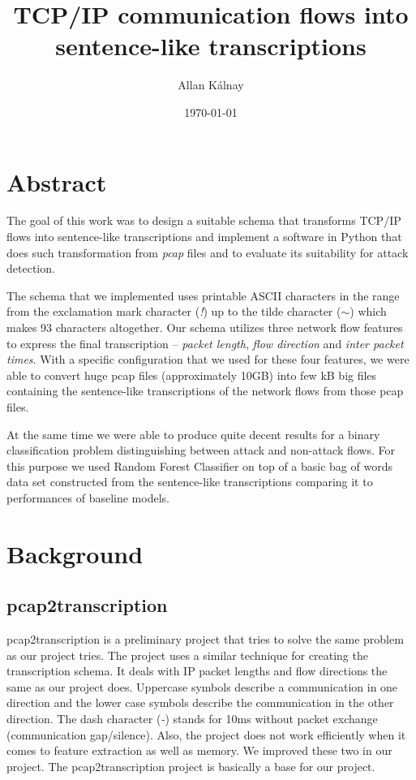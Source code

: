 \documentclass{article}
\title{TCP/IP communication flows into sentence-like transcriptions}
\author{Allan Kálnay}
\date{\today}
\begin{document}
\sloppy

\maketitle

\section*{Abstract}
The goal of this work was to design a suitable schema that transforms TCP/IP flows into sentence-like transcriptions and implement a software in Python that does such transformation from \textit{pcap} files and to evaluate its suitability for attack detection.

The schema that we implemented uses printable ASCII characters in the range from the exclamation mark character (\textit{!}) up to the tilde character (\textit{$\sim$}) which makes 93 characters altogether. Our schema utilizes three network flow features to express the final transcription -- \textit{packet length}, \textit{flow direction} and \textit{inter packet times}. With a specific configuration that we used for these four features, we were able to convert huge pcap files (approximately 10GB) into few kB big files containing the sentence-like transcriptions of the network flows from those pcap files.

At the same time we were able to produce quite decent results for a binary classification problem distinguishing between attack and non-attack flows. For this purpose we used Random Forest Classifier on top of a basic bag of words data set constructed from the sentence-like transcriptions comparing it to performances of baseline models.

\newpage
\tableofcontents
\newpage

\section{Background}
\subsection{pcap2transcription}
pcap2transcription \cite{pcap2transcription} is a preliminary project that tries to solve the same problem as our project tries. The project uses a similar technique for creating the transcription schema. It deals with IP packet lengths and flow directions the same as our project does. Uppercase symbols describe a communication in one direction and the lower case symbols describe the communication in the other direction. The dash character (\textit{-}) stands for 10ms without packet exchange (communication gap/silence). Also, the project does not work efficiently when it comes to feature extraction as well as memory. We improved these two in our project. The pcap2transcription project is basically a base for our project.
\end{document}
